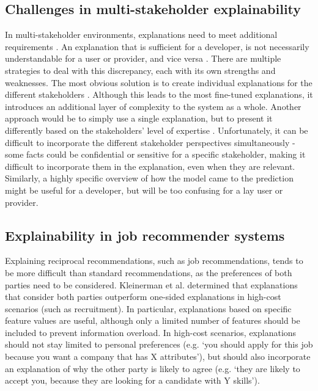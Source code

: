 \subsection{Challenges in multi-stakeholder explainability}
In multi-stakeholder environments, explanations need to meet additional requirements \cite{abdollahpouri2020multistakeholder}. An explanation that is sufficient for a developer, is not necessarily understandable for a user or provider, and vice versa \cite{szymanski2021visual}. There are multiple strategies to deal with this discrepancy, each with its own strengths and weaknesses. The most obvious solution is to create individual explanations for the different stakeholders \cite{yildirim2021bideepfm}. Although this leads to the most fine-tuned explanations, it introduces an additional layer of complexity to the system as a whole. Another approach would be to simply use a single explanation, but to present it differently based on the stakeholders' level of expertise \cite{abdollahpouri2020multistakeholder}. Unfortunately, it can be difficult to incorporate the different stakeholder perspectives simultaneously - some facts could be confidential or sensitive for a specific stakeholder, making it difficult to incorporate them in the explanation, even when they are relevant. Similarly, a highly specific overview of how the model came to the prediction might be useful for a developer, but will be too confusing for a lay user or provider. 

\subsection{Explainability in job recommender systems}
Explaining reciprocal recommendations, such as job recommendations, tends to be more difficult than standard recommendations, as the preferences of both parties need to be considered. Kleinerman et al. \cite{kleinerman2018providing} determined that explanations that consider both parties outperform one-sided explanations in high-cost scenarios (such as recruitment). In particular, explanations based on specific feature values are useful, although only a limited number of features should be included to prevent information overload. In high-cost scenarios, explanations should not stay limited to personal preferences (e.g. `you should apply for this job because you want a company that has X attributes'), but should also incorporate an explanation of why the other party is likely to agree (e.g. `they are likely to accept you, because they are looking for a candidate with Y skills'). 

